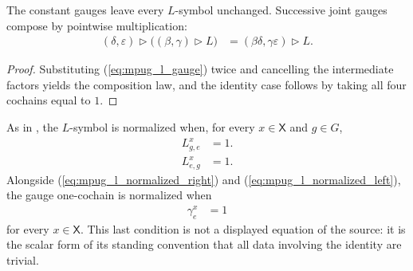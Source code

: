 \begin{lemma}
    \label{thm:mpug_l_gauge_composition}
    \leanok
    The constant gauges leave every $L$-symbol unchanged.
    Successive joint gauges compose by pointwise multiplication:
    \begin{align}
        (\delta,\varepsilon)\mathbin{\triangleright}
        \bigl((\beta,\gamma)\mathbin{\triangleright}L\bigr)
         & = (\beta\delta,\gamma\varepsilon)
        \mathbin{\triangleright}L.
        \label{eq:mpug_l_gauge_composition}
    \end{align}
\end{lemma}
\begin{proof}\leanok
    Substituting (\ref{eq:mpug_l_gauge}) twice and cancelling the intermediate
    factors yields the composition law, and the identity case
    follows by taking all four cochains equal to $1$.
\end{proof}

\begin{definition}
    \label{def:mpug_l_normalized}
    \leanok
    As in \cite{FrancoRubio2025MPUGauging}, the $L$-symbol is normalized when,
    for every $x\in\mathsf X$ and $g\in G$,
    \begin{align}
        L^x_{g,e} & =1.
        \label{eq:mpug_l_normalized_right}
    \end{align}
    \begin{align}
        L^x_{e,g} & =1.
        \label{eq:mpug_l_normalized_left}
    \end{align}
    Alongside (\ref{eq:mpug_l_normalized_right}) and
    (\ref{eq:mpug_l_normalized_left}), the gauge one-cochain is normalized
    when
    \begin{align}
        \gamma^x_e & =1
        \label{eq:mpug_action_gauge_normalized}
    \end{align}
    for every $x\in\mathsf X$. This last condition is not a displayed
    equation of the source: it is the scalar form of its standing
    convention that all data involving the identity are trivial.
\end{definition}

